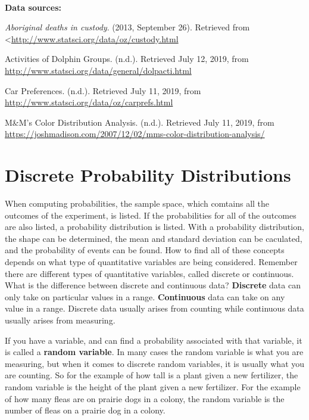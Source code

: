 \documentclass[]{book}
\begin{document}
\textbf{\\
}

\textbf{Data sources:}

\emph{Aboriginal deaths in custody}. (2013, September 26). Retrieved from
\textless{}\url{http://www.statsci.org/data/oz/custody.html}

Activities of Dolphin Groups. (n.d.). Retrieved July 12, 2019, from \url{http://www.statsci.org/data/general/dolpacti.html}

Car Preferences. (n.d.). Retrieved July 11, 2019, from \url{http://www.statsci.org/data/oz/carprefs.html}

M\&M's Color Distribution Analysis. (n.d.). Retrieved July 11, 2019, from \url{https://joshmadison.com/2007/12/02/mms-color-distribution-analysis/}

\hypertarget{discrete-probability-distributions}{%
\chapter{Discrete Probability Distributions}\label{discrete-probability-distributions}}

When computing probabilities, the sample space, which comtains all the outcomes of the experiment, is listed. If the probabilities for all of the outcomes are also listed, a probability distribution is listed. With a probability distribution, the shape can be determined, the mean and standard deviation can be caculated, and the probability of events can be found. How to find all of these concepts depends on what type of quantitative variables are being considered. Remember there are different types of quantitative variables, called discrete or continuous. What is the difference between discrete and continuous data? \textbf{Discrete} data can only take on particular values in a range. \textbf{Continuous} data can take on any value in a range. Discrete data usually arises from counting while continuous data usually arises from measuring.

If you have a variable, and can find a probability associated with that variable, it is called a \textbf{random variable}. In many cases the random variable is what you are measuring, but when it comes to discrete random variables, it is usually what you are counting. So for the example of how tall is a plant given a new fertilizer, the random variable is the height of the plant given a new fertilizer. For the example of how many fleas are on prairie dogs in a colony, the random variable is the number of fleas on a prairie dog in a colony.
\end{document}
